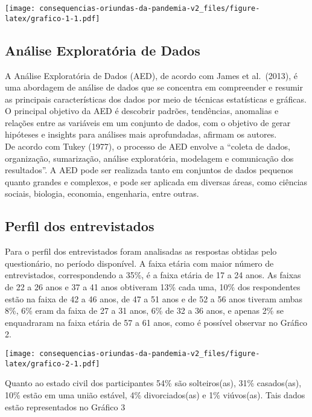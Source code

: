 \documentclass[
]{article}
\begin{document}
\texttt{[image: consequencias-oriundas-da-pandemia-v2\_files/figure-latex/grafico-1-1.pdf]}

\hypertarget{anuxe1lise-exploratuxf3ria-de-dados}{%
\subsection{Análise Exploratória de
Dados}\label{anuxe1lise-exploratuxf3ria-de-dados}}

A Análise Exploratória de Dados (AED), de acordo com James et
al.~(2013), é uma abordagem de análise de dados que se concentra em
compreender e resumir as principais características dos dados por meio
de técnicas estatísticas e gráficas. O principal objetivo da AED é
descobrir padrões, tendências, anomalias e relações entre as variáveis
em um conjunto de dados, com o objetivo de gerar hipóteses e insights
para análises mais aprofundadas, afirmam os autores.\\
De acordo com Tukey (1977), o processo de AED envolve a ``coleta de
dados, organização, sumarização, análise exploratória, modelagem e
comunicação dos resultados''. A AED pode ser realizada tanto em
conjuntos de dados pequenos quanto grandes e complexos, e pode ser
aplicada em diversas áreas, como ciências sociais, biologia, economia,
engenharia, entre outras.

\hypertarget{perfil-dos-entrevistados}{%
\subsection{Perfil dos entrevistados}\label{perfil-dos-entrevistados}}

Para o perfil dos entrevistados foram analisadas as respostas obtidas
pelo questionário, no período disponível. A faixa etária com maior
número de entrevistados, correspondendo a 35\%, é a faixa etária de 17 a
24 anos. As faixas de 22 a 26 anos e 37 a 41 anos obtiveram 13\% cada
uma, 10\% dos respondentes estão na faixa de 42 a 46 anos, de 47 a 51
anos e de 52 a 56 anos tiveram ambas 8\%, 6\% eram da faixa de 27 a 31
anos, 6\% de 32 a 36 anos, e apenas 2\% se enquadraram na faixa etária
de 57 a 61 anos, como é possível observar no Gráfico 2.

\texttt{[image: consequencias-oriundas-da-pandemia-v2\_files/figure-latex/grafico-2-1.pdf]}

Quanto ao estado civil dos participantes 54\% são solteiros(as), 31\%
casados(as), 10\% estão em uma união estável, 4\% divorciados(as) e 1\%
viúvos(as). Tais dados estão representados no Gráfico 3
\end{document}
